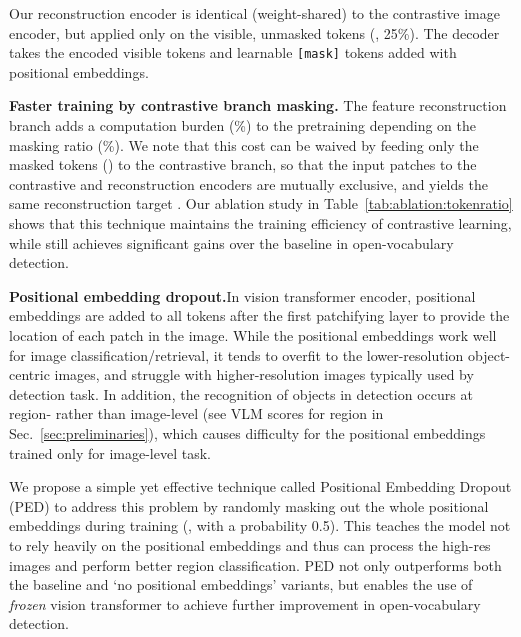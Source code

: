 \documentclass[10pt,twocolumn,letterpaper]{article}
\newcommand{\secref}[1]{Sec.~\ref{#1}}
\renewcommand{\paragraph}[1]{\vspace{1mm}\noindent\textbf{#1}}
\begin{document}
Our reconstruction encoder is identical (weight-shared) to the contrastive image encoder, but applied only on the visible, unmasked tokens (\eg, 25\%). The decoder takes the encoded visible tokens and learnable \texttt{[mask]} tokens added with positional embeddings.

\paragraph{Faster training by contrastive branch masking.}\quad
The feature reconstruction branch adds a computation burden (\%) to the pretraining depending on the masking ratio (\%). We note that this cost can be waived by feeding only the masked tokens () to the contrastive branch, so that the input patches to the contrastive and reconstruction encoders are mutually exclusive, and yields the same reconstruction target . Our ablation study in Table~\ref{tab:ablation:tokenratio} shows that this technique maintains the training efficiency of contrastive learning, while still achieves significant gains over the baseline in open-vocabulary detection.


\paragraph{Positional embedding dropout.}\quad In vision transformer encoder, positional embeddings are added to all tokens after the first patchifying layer to provide the location of each patch in the image. While the positional embeddings work well for image classification/retrieval, it tends to overfit to the lower-resolution object-centric images, and struggle with higher-resolution images typically used by detection task. In addition, the recognition of objects in detection occurs at region- rather than image-level  (\eg see VLM scores  for region  in \secref{sec:preliminaries}), which causes difficulty for the positional embeddings trained only for image-level task.

We propose a simple yet effective technique called Positional Embedding Dropout (PED) to address this problem by randomly masking out the whole positional embeddings during training (\eg, with a probability 0.5). This teaches the model not to rely heavily on the positional embeddings and thus can process the high-res images and perform better region classification. PED not only outperforms both the baseline and `no positional embeddings' variants, but enables the use of \textit{frozen} vision transformer to achieve further improvement in open-vocabulary detection.
\end{document}
